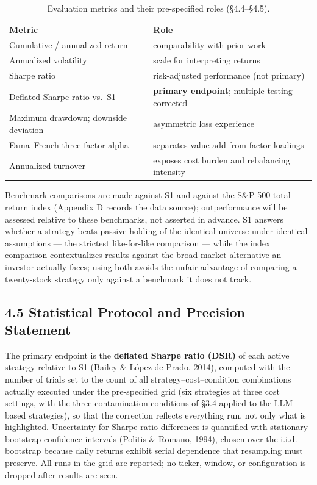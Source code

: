 \documentclass[
  12pt,
]{article}
\begin{document}
\begin{table}[H]
\centering\small
\caption{Evaluation metrics and their pre-specified roles (§4.4–§4.5).}
\label{tab:metrics}
\begin{tabular}{ll}
\toprule
Metric & Role \\
\midrule
Cumulative / annualized return & comparability with prior work \\
Annualized volatility & scale for interpreting returns \\
Sharpe ratio & risk-adjusted performance (not primary) \\
Deflated Sharpe ratio vs.\ S1 & \textbf{primary endpoint}; multiple-testing corrected \\
Maximum drawdown; downside deviation & asymmetric loss experience \\
Fama–French three-factor alpha & separates value-add from factor loadings \\
Annualized turnover & exposes cost burden and rebalancing intensity \\
\bottomrule
\end{tabular}
\end{table}


Benchmark comparisons are made against S1 and against the S\&P 500
total-return index (Appendix D records the data source); outperformance
will be assessed relative to these benchmarks, not asserted in advance.
S1 answers whether a strategy beats passive holding of the identical
universe under identical assumptions --- the strictest like-for-like
comparison --- while the index comparison contextualizes results against
the broad-market alternative an investor actually faces; using both
avoids the unfair advantage of comparing a twenty-stock strategy only
against a benchmark it does not track.

\hypertarget{statistical-protocol-and-precision-statement}{%
\subsection{4.5 Statistical Protocol and Precision
Statement}\label{statistical-protocol-and-precision-statement}}

The primary endpoint is the \textbf{deflated Sharpe ratio (DSR)} of each
active strategy relative to S1 (Bailey \& López de Prado, 2014),
computed with the number of trials set to the count of all
strategy--cost--condition combinations actually executed under the
pre-specified grid (six strategies at three cost settings, with the
three contamination conditions of §3.4 applied to the LLM-based
strategies), so that the correction reflects everything run, not only
what is highlighted. Uncertainty for Sharpe-ratio differences is
quantified with stationary-bootstrap confidence intervals (Politis \&
Romano, 1994), chosen over the i.i.d. bootstrap because daily returns
exhibit serial dependence that resampling must preserve. All runs in the
grid are reported; no ticker, window, or configuration is dropped after
results are seen.
\end{document}
